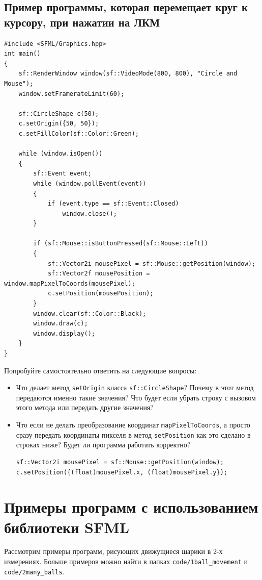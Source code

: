 \documentclass{article}
\begin{document}
\subsection*{Пример программы, которая перемещает круг к курсору, при нажатии на ЛКМ}
\begin{lstlisting}
#include <SFML/Graphics.hpp>
int main()
{
    sf::RenderWindow window(sf::VideoMode(800, 800), "Circle and Mouse");
    window.setFramerateLimit(60);
    
    sf::CircleShape c(50);
    c.setOrigin({50, 50});
    c.setFillColor(sf::Color::Green);
    
    while (window.isOpen())
    {
        sf::Event event;
        while (window.pollEvent(event)) 
        {
            if (event.type == sf::Event::Closed)
                window.close();
        }
        
        if (sf::Mouse::isButtonPressed(sf::Mouse::Left))
        {
            sf::Vector2i mousePixel = sf::Mouse::getPosition(window);
            sf::Vector2f mousePosition = window.mapPixelToCoords(mousePixel);
            c.setPosition(mousePosition);
        }
        window.clear(sf::Color::Black);
        window.draw(c);
        window.display();
    }
}
\end{lstlisting}
Попробуйте самостоятельно ответить на следующие вопросы:
\begin{itemize}
\item Что делает метод \texttt{setOrigin} класса \texttt{sf::CircleShape}? Почему в этот метод передаются именно такие значения? Что будет если убрать строку с вызовом этого метода или передать другие значения?
\item Что если не делать преобразование координат \texttt{mapPixelToCoords}, а просто сразу передать координаты пикселя в метод \texttt{setPosition} как это сделано в строках ниже? Будет ли программа работать корректно?
\begin{lstlisting}[frame=none]
sf::Vector2i mousePixel = sf::Mouse::getPosition(window);
c.setPosition({(float)mousePixel.x, (float)mousePixel.y});
\end{lstlisting}
\end{itemize}


\newpage
\section{Примеры программ с использованием библиотеки SFML}
Рассмотрим примеры программ, рисующих движущиеся шарики в 2-х измерениях.  Больше примеров можно найти в папках \texttt{code/1ball\_movement} и \texttt{code/2many\_balls}.
\end{document}
